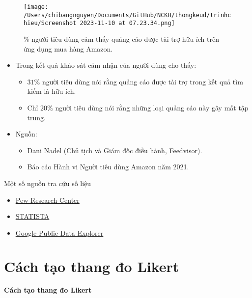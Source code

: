 \documentclass{beamer}
\begin{document}
\begin{frame}
\begin{figure}
    \centering
    \texttt{[image: /Users/chibangnguyen/Documents/GitHub/NCKH/thongkeud/trinhchieu/Screenshot 2023-11-10 at 07.23.34.png]}
    \caption{\centering $\%$ người tiêu dùng cảm thấy quảng cáo được tài trợ hữu ích trên ứng dụng mua hàng Amazon.}
\end{figure}        
\end{frame}

\begin{frame}
    \begin{itemize}
        \item Trong kết quả khảo sát cảm nhận của người dùng cho thấy:
        \begin{itemize}
        \item $31\%$ người tiêu dùng nói rằng quảng cáo được tài trợ trong kết quả tìm kiếm là hữu ích. \item Chỉ $20\%$ người tiêu dùng nói rằng những loại quảng cáo này gây mất tập trung.
        \end{itemize}    
        \item Nguồn:
        \begin{itemize}
        \item Dani Nadel (Chủ tịch và Giám đốc điều hành, Feedvisor).
        \item Báo cáo Hành vi Người tiêu dùng Amazon năm 2021.
        \end{itemize}  
    \end{itemize}
\end{frame}
\begin{frame}{Một số nguồn tra cứu số liệu}
    \begin{itemize}
    \item  \Large \href{https://www.pewresearch.org/}{Pew Research Center}
    \item \href{https://www.statista.com/}{STATISTA}
    \item \href{https://www.google.com/publicdata/directory}{Google Public Data Explorer}
    \end{itemize}
\end{frame}
\section{Cách tạo thang đo Likert}
\begin{frame}
    \centering
    \textbf{\Huge Cách tạo thang đo Likert}
\end{frame}
\end{document}
